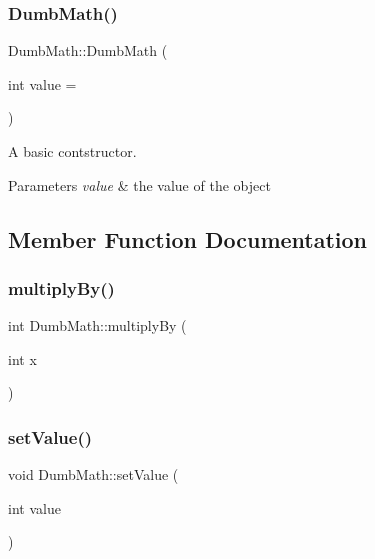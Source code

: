 \subsubsection{\texorpdfstring{Dumb\+Math()}{DumbMath()}}
{\footnotesize\ttfamily Dumb\+Math\+::\+Dumb\+Math (\begin{DoxyParamCaption}\item[{int}]{value = {} }\end{DoxyParamCaption})}



A basic contstructor. 


\begin{DoxyParams}{Parameters}
{\em value} & the value of the object \\
\hline
\end{DoxyParams}


\subsection{Member Function Documentation}
\mbox{\label{classbasic_lib_1_1_dumb_math_a259a29619fe7b9f3609608e2d764e51b}} 
\subsubsection{\texorpdfstring{multiply\+By()}{multiplyBy()}}
{\footnotesize\ttfamily int Dumb\+Math\+::multiply\+By (\begin{DoxyParamCaption}\item[{int}]{x }\end{DoxyParamCaption})}

\mbox{\label{classbasic_lib_1_1_dumb_math_aae5e0d45c7487f89bd49e6d84e0a9356}} 
\subsubsection{\texorpdfstring{set\+Value()}{setValue()}}
{\footnotesize\ttfamily void Dumb\+Math\+::set\+Value (\begin{DoxyParamCaption}\item[{int}]{value }\end{DoxyParamCaption})}



